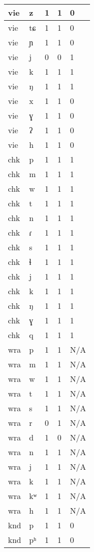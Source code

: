 \begin{longtable}{ | l | l | l | l | l | }
	vie & z & 1 & 1 & 0 \\ \hline
	vie & tɕ & 1 & 1 & 0 \\ \hline
	vie & ɲ & 1 & 1 & 0 \\ \hline
	vie & j & 0 & 0 & 1 \\ \hline
	vie & k & 1 & 1 & 1 \\ \hline
	vie & ŋ & 1 & 1 & 1 \\ \hline
	vie & x & 1 & 1 & 0 \\ \hline
	vie & ɣ & 1 & 1 & 0 \\ \hline
	vie & ʔ & 1 & 1 & 0 \\ \hline
	vie & h & 1 & 1 & 0 \\ \hline
	chk & p & 1 & 1 & 1 \\ \hline
	chk & m & 1 & 1 & 1 \\ \hline
	chk & w & 1 & 1 & 1 \\ \hline
	chk & t & 1 & 1 & 1 \\ \hline
	chk & n & 1 & 1 & 1 \\ \hline
	chk & ɾ & 1 & 1 & 1 \\ \hline
	chk & s & 1 & 1 & 1 \\ \hline
	chk & ɬ & 1 & 1 & 1 \\ \hline
	chk & j & 1 & 1 & 1 \\ \hline
	chk & k & 1 & 1 & 1 \\ \hline
	chk & ŋ & 1 & 1 & 1 \\ \hline
	chk & ɣ & 1 & 1 & 1 \\ \hline
	chk & q & 1 & 1 & 1 \\ \hline
	wra & p & 1 & 1 & N/A \\ \hline
	wra & m & 1 & 1 & N/A \\ \hline
	wra & w & 1 & 1 & N/A \\ \hline
	wra & t & 1 & 1 & N/A \\ \hline
	wra & s & 1 & 1 & N/A \\ \hline
	wra & r & 0 & 1 & N/A \\ \hline
	wra & d & 1 & 0 & N/A \\ \hline
	wra & n & 1 & 1 & N/A \\ \hline
	wra & j & 1 & 1 & N/A \\ \hline
	wra & k & 1 & 1 & N/A \\ \hline
	wra & kʷ & 1 & 1 & N/A \\ \hline
	wra & h & 1 & 1 & N/A \\ \hline
	knd & p & 1 & 1 & 0 \\ \hline
	knd & pʰ & 1 & 1 & 0 \\ \hline

\end{longtable}
